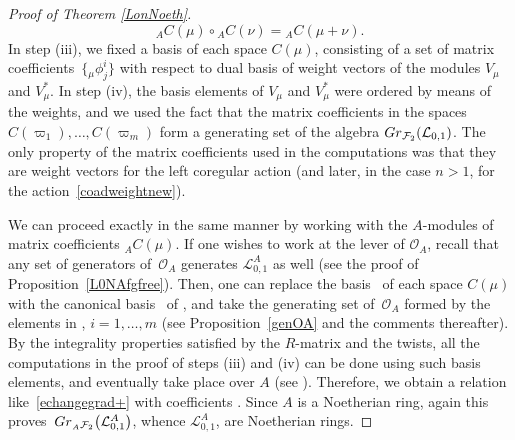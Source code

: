 \documentclass[11pt]{article}
\numberwithin{equation}{section}
\numberwithin{equation}{section}
\theoremstyle{definition}
\newcommand{\Ll}{{\mathcal L}}
\newcommand{\Oo}{{\mathcal O}}
\newcommand{\smallbullet}{%
\vcenter{\hbox{\,\scalebox{0.5}{$\bullet$}\,}}
}
\begin{document}
\begin{proof}[Proof of Theorem \ref{LonNoeth}]
\[%
{}_AC(\mu) \circ{}_AC(\nu) = {}_AC(\mu + \nu).
\]
In step (iii), we fixed a basis of each space $C(\mu)$, consisting of a set of matrix coefficients~$\big\{{}_\mu\phi^i_j\big\}$ with respect to dual basis of weight vectors of the modules $V_\mu$ and $V_\mu^*$. In step (iv), the basis elements of $V_\mu$ and $V_\mu^*$ were ordered by means of the weights, and we used the fact that the matrix coefficients in the spaces $C(\varpi_1),\dots,C(\varpi_m)$ form a generating set of the algebra $ {\rm Gr}_{\mathcal{F}_2}({\mathcal L}_{0,1})$. The only property of the matrix coefficients used in the computations was that they are weight vectors for the left coregular action (and later, in the case $n>1$, for the action~\eqref{coadweightnew}).

We can proceed exactly in the same manner by working with the $A$-modules of matrix coefficients ${}_AC(\mu)$. If one wishes to work at the lever of $\Oo_A$, recall that any set of generators of~$\Oo_A$ generates $\Ll_{0,1}^A$ as well (see the proof of Proposition~\ref{L0NAfgfree}). Then, one can replace the basis~ of each space $C(\mu)$ with the canonical basis~ of \smash{${}_A \overset{\raisebox{-1.5pt}{\scriptsize$\smallbullet$}}{C} (\mu)$}, and take the generating set of~$\Oo_A$ formed by the elements in , $i=1,\dots,m$ (see Proposition~\ref{genOA} and the comments thereafter). By the integrality properties satisfied by the $R$-matrix and the twists, all the computations in the proof of steps (iii) and (iv) can be done using such basis elements, and eventually take place over $A$ (see \cite[Propositions 4.10 and 6.9]{BR}). Therefore, we obtain a relation like~\eqref{echangegrad+} with coefficients . Since $A$ is a Noetherian ring, again this proves~${ {\rm Gr}_{ {}_A\mathcal{F}_2}\big({\mathcal L}_{0,1}^A\big)}$, whence ${\mathcal L}_{0,1}^A$, are Noetherian rings.


\end{proof}
\end{document}
